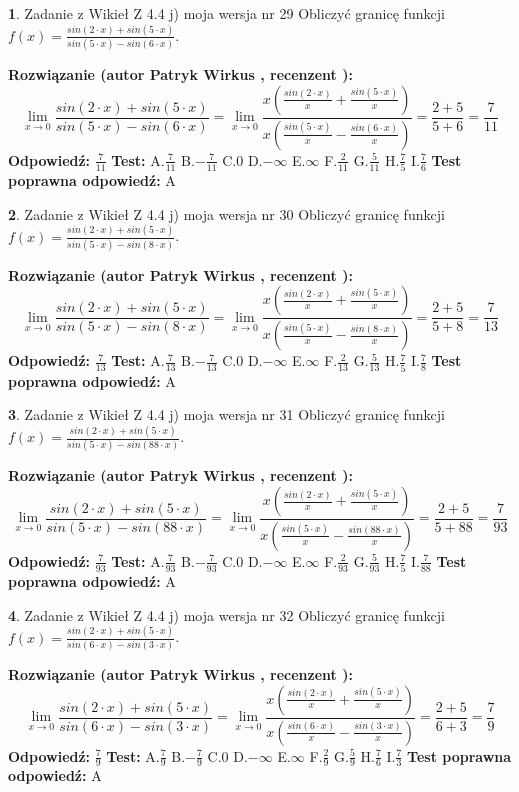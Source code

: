 \documentclass[12pt, a4paper]{article}
\theoremstyle{definition} %
\newtheorem{zad}{}
\newcommand{\zadStart}[1]{\begin{zad}#1\newline}
\newcommand{\zadStop}{\end{zad}}
\newcommand{\rozwStart}[2]{\noindent \textbf{Rozwiązanie (autor #1 , recenzent #2): }\newline}
\newcommand{\rozwStop}{\newline}
\newcommand{\odpStart}{\noindent \textbf{Odpowiedź:}\newline}
\newcommand{\odpStop}{\newline}
\newcommand{\testStart}{\noindent \textbf{Test:}\newline}
\newcommand{\testStop}{\newline}
\newcommand{\kluczStart}{\noindent \textbf{Test poprawna odpowiedź:}\newline}
\newcommand{\kluczStop}{\newline}
\begin{document}
\zadStart{Zadanie z Wikieł Z 4.4 j) moja wersja nr 29}
Obliczyć granicę funkcji $f(x)=\frac{sin(2\cdot x) +sin(5\cdot x)}{sin(5\cdot x) -sin(6\cdot x)}$.
\zadStop
\rozwStart{Patryk Wirkus}{}
$$\lim\limits_{x\to 0}\frac{sin(2\cdot x) +sin(5\cdot x)}{sin(5\cdot x) -sin(6\cdot x)}=\lim\limits_{x\to 0}\frac{x(\frac{sin(2\cdot x)}{x}+\frac{sin(5\cdot x)}{x})}{x(\frac{sin(5\cdot x)}{x}-\frac{sin(6\cdot x)}{x})}=\frac{2+5}{5+6} = \frac{7}{11}$$
\rozwStop
\odpStart
$\frac{7}{11}$
\odpStop
\testStart
A.$\frac{7}{11}$
B.$-\frac{7}{11}$
C.$0$
D.$-\infty$
E.$\infty$
F.$\frac{2}{11}$
G.$\frac{5}{11}$
H.$\frac{7}{5}$
I.$\frac{7}{6}$
\testStop
\kluczStart
A
\kluczStop



\zadStart{Zadanie z Wikieł Z 4.4 j) moja wersja nr 30}
Obliczyć granicę funkcji $f(x)=\frac{sin(2\cdot x) +sin(5\cdot x)}{sin(5\cdot x) -sin(8\cdot x)}$.
\zadStop
\rozwStart{Patryk Wirkus}{}
$$\lim\limits_{x\to 0}\frac{sin(2\cdot x) +sin(5\cdot x)}{sin(5\cdot x) -sin(8\cdot x)}=\lim\limits_{x\to 0}\frac{x(\frac{sin(2\cdot x)}{x}+\frac{sin(5\cdot x)}{x})}{x(\frac{sin(5\cdot x)}{x}-\frac{sin(8\cdot x)}{x})}=\frac{2+5}{5+8} = \frac{7}{13}$$
\rozwStop
\odpStart
$\frac{7}{13}$
\odpStop
\testStart
A.$\frac{7}{13}$
B.$-\frac{7}{13}$
C.$0$
D.$-\infty$
E.$\infty$
F.$\frac{2}{13}$
G.$\frac{5}{13}$
H.$\frac{7}{5}$
I.$\frac{7}{8}$
\testStop
\kluczStart
A
\kluczStop



\zadStart{Zadanie z Wikieł Z 4.4 j) moja wersja nr 31}
Obliczyć granicę funkcji $f(x)=\frac{sin(2\cdot x) +sin(5\cdot x)}{sin(5\cdot x) -sin(88\cdot x)}$.
\zadStop
\rozwStart{Patryk Wirkus}{}
$$\lim\limits_{x\to 0}\frac{sin(2\cdot x) +sin(5\cdot x)}{sin(5\cdot x) -sin(88\cdot x)}=\lim\limits_{x\to 0}\frac{x(\frac{sin(2\cdot x)}{x}+\frac{sin(5\cdot x)}{x})}{x(\frac{sin(5\cdot x)}{x}-\frac{sin(88\cdot x)}{x})}=\frac{2+5}{5+88} = \frac{7}{93}$$
\rozwStop
\odpStart
$\frac{7}{93}$
\odpStop
\testStart
A.$\frac{7}{93}$
B.$-\frac{7}{93}$
C.$0$
D.$-\infty$
E.$\infty$
F.$\frac{2}{93}$
G.$\frac{5}{93}$
H.$\frac{7}{5}$
I.$\frac{7}{88}$
\testStop
\kluczStart
A
\kluczStop



\zadStart{Zadanie z Wikieł Z 4.4 j) moja wersja nr 32}
Obliczyć granicę funkcji $f(x)=\frac{sin(2\cdot x) +sin(5\cdot x)}{sin(6\cdot x) -sin(3\cdot x)}$.
\zadStop
\rozwStart{Patryk Wirkus}{}
$$\lim\limits_{x\to 0}\frac{sin(2\cdot x) +sin(5\cdot x)}{sin(6\cdot x) -sin(3\cdot x)}=\lim\limits_{x\to 0}\frac{x(\frac{sin(2\cdot x)}{x}+\frac{sin(5\cdot x)}{x})}{x(\frac{sin(6\cdot x)}{x}-\frac{sin(3\cdot x)}{x})}=\frac{2+5}{6+3} = \frac{7}{9}$$
\rozwStop
\odpStart
$\frac{7}{9}$
\odpStop
\testStart
A.$\frac{7}{9}$
B.$-\frac{7}{9}$
C.$0$
D.$-\infty$
E.$\infty$
F.$\frac{2}{9}$
G.$\frac{5}{9}$
H.$\frac{7}{6}$
I.$\frac{7}{3}$
\testStop
\kluczStart
A
\kluczStop
\end{document}

